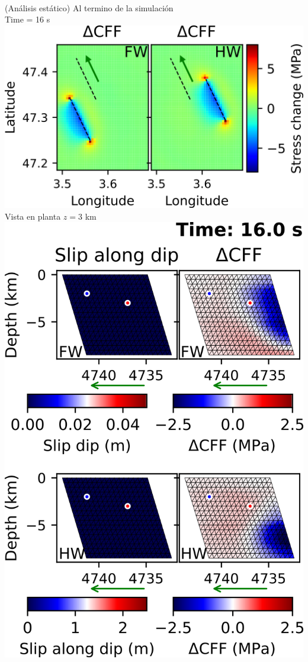 \begin{poster}
{\begin{minipage}{0.32\linewidth}
  \\
 (An\'alisis est\'atico) \vskip 0.2cm
 Al termino de la simulaci\'on \\ 
 Time = 16 s \vskip 0.3cm
\includegraphics[width=0.87\linewidth]{images/horizontal_delta_00080_fix_2.png} \\
Vista en planta $z = 3$ km
\vskip 0.2cm
\vskip 0.2cm
 \includegraphics[width=0.87\linewidth]{images/horizontal_delta_00080_fix_1.png} \\

\end{minipage}}
\end{poster}
